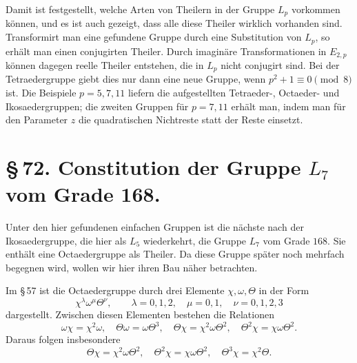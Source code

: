 \documentclass[11pt]{article}
\begin{document}
Damit ist festgestellt, welche Arten von Theilern in der Gruppe $L_p$ vorkommen können, und es ist auch gezeigt, dass alle diese Theiler wirklich vorhanden sind. Transformirt man eine gefundene Gruppe durch eine Substitution von $L_p$, so erhält man einen conjugirten Theiler. Durch imaginäre Transformationen in $E_{2,p}$ können dagegen reelle Theiler entstehen, die in $L_p$ nicht conjugirt sind. Bei der Tetraedergruppe giebt dies nur dann eine neue Gruppe, wenn $p^2+1\equiv0\pmod8$ ist. Die Beispiele $p=5,7,11$ liefern die aufgestellten Tetraeder-, Octaeder- und Ikosaedergruppen; die zweiten Gruppen für $p=7,11$ erhält man, indem man für den Parameter $z$ die quadratischen Nichtreste statt der Reste einsetzt.

\section*{\S\,72. Constitution der Gruppe $L_7$ vom Grade 168.}

Unter den hier gefundenen einfachen Gruppen ist die nächste nach der Ikosaedergruppe, die hier als $L_5$ wiederkehrt, die Gruppe $L_7$ vom Grade $168$. Sie enthält eine Octaedergruppe als Theiler. Da diese Gruppe später noch mehrfach begegnen wird, wollen wir hier ihren Bau näher betrachten.

Im \S\,57 ist die Octaedergruppe durch drei Elemente $\chi,\omega,\Theta$ in der Form
\begin{equation}
 \chi^{\lambda}\omega^{\mu}\Theta^{\nu},
 \qquad \lambda=0,1,2,\quad \mu=0,1,
 \quad \nu=0,1,2,3
 \tag{1}
\end{equation}
dargestellt. Zwischen diesen Elementen bestehen die Relationen
\begin{equation}
 \omega\chi=\chi^2\omega,
 \quad \Theta\omega=\omega\Theta^3,
 \quad \Theta\chi=\chi^2\omega\Theta^2,
 \quad \Theta^2\chi=\chi\omega\Theta^2.
 \tag{2}
\end{equation}
Daraus folgen insbesondere
\begin{equation}
 \Theta\chi=\chi^2\omega\Theta^2,
 \quad \Theta^2\chi=\chi\omega\Theta^2,
 \quad \Theta^3\chi=\chi^2\Theta .
 \tag{3}
\end{equation}
\end{document}
